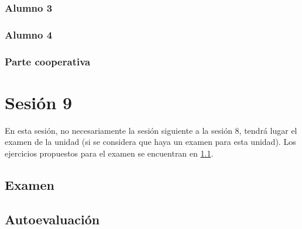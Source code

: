 \subsubsection{Alumno 3}


\subsubsection{Alumno 4}



\subsubsection{Parte cooperativa}
\label{ses7:coop}





\section{Sesión 9}


En esta sesión, no necesariamente la sesión siguiente a la sesión 8, tendrá lugar el examen de la unidad (si se considera que haya un examen para esta unidad).
%
Los ejercicios propuestos para el examen se encuentran en \ref{examen}.


\subsection{Examen}
\label{examen}

\subsection{Autoevaluación}
\label{app:autoeval}


